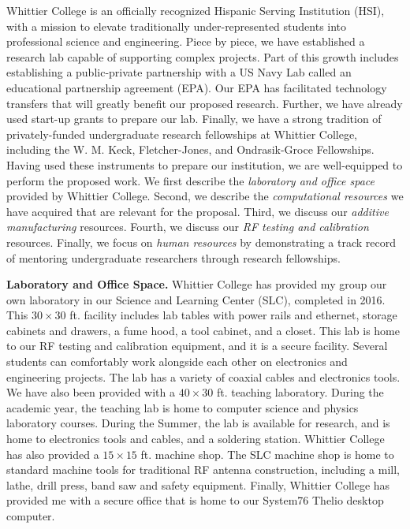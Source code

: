 \documentclass[10pt]{amsart}
\theoremstyle{definition}
\numberwithin{equation}{section}
\begin{document}
Whittier College is an officially recognized Hispanic Serving Institution (HSI), with a mission to elevate traditionally under-represented students into professional science and engineering.  Piece by piece, we have established a research lab capable of supporting complex projects.  Part of this growth includes establishing a public-private partnership with a US Navy Lab called an educational partnership agreement (EPA).  Our EPA has facilitated technology transfers that will greatly benefit our proposed research.  Further, we have already used start-up grants to prepare our lab.  Finally, we have a strong tradition of privately-funded undergraduate research fellowships at Whittier College, including the W. M. Keck, Fletcher-Jones, and Ondrasik-Groce Fellowships.  Having used these instruments to prepare our institution, we are well-equipped to perform the proposed work.  We first describe the \textit{laboratory and office space} provided by Whittier College.  Second, we describe the \textit{computational resources} we have acquired that are relevant for the proposal.  Third, we discuss our \textit{additive manufacturing} resources.  Fourth, we discuss our \textit{RF testing and calibration} resources.  Finally, we focus on \textit{human resources} by demonstrating a track record of mentoring undergraduate researchers through research fellowships. 

\textbf{Laboratory and Office Space.} Whittier College has provided my group our own laboratory in our Science and Learning Center (SLC), completed in 2016.  This $30 \times 30$ ft. facility includes lab tables with power rails and ethernet, storage cabinets and drawers, a fume hood, a tool cabinet, and a closet.  This lab is home to our RF testing and calibration equipment, and it is a secure facility.  Several students can comfortably work alongside each other on electronics and engineering projects.  The lab has a variety of coaxial cables and electronics tools.  We have also been provided with a $40 \times 30$ ft. teaching laboratory.  During the academic year, the teaching lab is home to computer science and physics laboratory courses.  During the Summer, the lab is available for research, and is home to electronics tools and cables, and a soldering station.  Whittier College has also provided a $15 \times 15$ ft. machine shop.  The SLC machine shop is home to standard machine tools for traditional RF antenna construction, including a mill, lathe, drill press, band saw and safety equipment.  Finally, Whittier College has provided me with a secure office that is home to our System76 Thelio desktop computer. 
\end{document}
